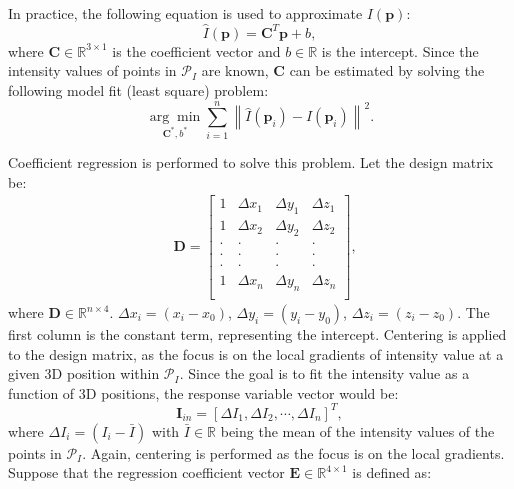 In practice, the following equation is used to approximate $I(\mathbf{p})$:
\begin{equation}
\hat{I}(\mathbf{p}) = \mathbf{C}^{T}\mathbf{p} + b, \label{eq4.1}
\end{equation}
where $\mathbf{C} \in \mathbb{R}^{3 \times 1}$ is the coefficient vector and $b\in \mathbb{R}$ is the intercept. Since the intensity values of points in $\mathcal{P}_{I}$ are known, $\mathbf{C}$ can be estimated by solving the following model fit (least square) problem:
\begin{equation}	
\underset{\mathbf{C}^{*}, b^{*}}{\arg \min } \sum_{i=1}^{n}\left\|\hat{I}(\mathbf{p}_{i})-I(\mathbf{p}_{i})\right\|^{2}\label{least2}.
\end{equation} \par
Coefficient regression \cite{barfoot} is performed to solve this problem. Let the design matrix be: 
\begin{equation}	
		\begin{aligned}
			& \mathbf{D} =\left[\begin{array}{cccc}  1 &\Delta x_{1} & \Delta y_{1} & \Delta z_{1} \\ 
  1 &\Delta x_{2} & \Delta y_{2} & \Delta z_{2} \\  
 \cdot   & \cdot  & \cdot & \cdot \\ 
 \cdot   & \cdot  & \cdot & \cdot \\  
 \cdot   & \cdot  & \cdot & \cdot \\  
  1 &\Delta x_{n} & \Delta y_{n} & \Delta z_{n} \\  
   \end{array}\right],
		\end{aligned}
	\end{equation} 
where $\mathbf{D}\in \mathbb{R}^{n \times 4}$. $\Delta x_{i}=(x_i-x_{0})$, $\Delta y_{i}=(y_i-y_{0})$, $\Delta z_{i}=(z_i-z_{0})$. The first column is the constant term, representing the intercept. Centering is applied to the design matrix, as the focus is on the local gradients of intensity value at a given 3D position within $\mathcal{P}_{I}$. Since the goal is to fit the intensity value as a function of 3D positions, the response variable vector would be:
\begin{equation}	
\mathbf{I}_{in} =\left[ \Delta I_{1}, \Delta I_{2}, \cdots, \Delta I_{n} \right]^{T},
\end{equation}
where $\Delta I_{i}=(I_i-\bar I)$ with $\bar I \in \mathbb{R}$ being the mean of the intensity values of the points in $\mathcal{P}_{I}$. Again, centering is performed as the focus is on the local gradients. Suppose that the regression coefficient vector $\mathbf{E}\in \mathbb{R}^{4 \times 1}$ is defined as:
